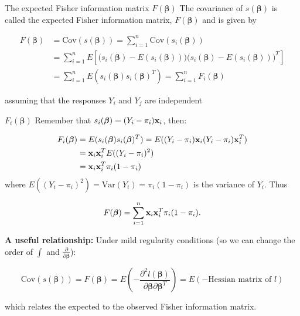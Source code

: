 \documentclass[
  ignorenonframetext,
]{beamer}
\begin{document}
\begin{frame}
\begin{block}{The expected Fisher information matrix
\(F(\boldsymbol{\beta})\)}
\label{the-expected-fisher-information-matrix-fboldsymbolbeta}
The covariance of \(s(\boldsymbol{\beta})\) is called the expected
Fisher information matrix, \(F(\boldsymbol{\beta})\) and is given by

\[
\begin{aligned} 
F(\boldsymbol{\beta}) &= \text{Cov}(s(\boldsymbol{\beta})) = \sum_{i=1}^n \text{Cov}(s_i(\boldsymbol{\beta})) \\
&= \sum_{i=1}^n E\left[\Big(s_i(\boldsymbol{\beta}) - E(s_i(\boldsymbol{\beta}))\Big)\Big(s_i(\boldsymbol{\beta})-E(s_i(\boldsymbol{\beta}))\Big)^T\right] \\
&= \sum_{i=1}^n E(s_i(\boldsymbol{\beta})s_i(\boldsymbol{\beta})^T) = \sum_{i=1}^n F_i(\boldsymbol{\beta}) \end{aligned}
\]

assuming that the responses \(Y_i\) and \(Y_j\) are independent
\end{block}
\end{frame}

\begin{frame}
\begin{block}{\(F_i(\boldsymbol{\beta})\)}
\label{f_iboldsymbolbeta}
Remember that \(s_i(\boldsymbol{\beta})=(Y_i-\pi_i){\bf x}_i\), then:

\[
\begin{aligned}
F_i(\boldsymbol{\beta}) &= E(s_i(\boldsymbol{\beta})s_i(\boldsymbol{\beta})^T) = E((Y_i-\pi_i){\bf x}_i(Y_i-\pi_i){\bf x}_i^T) \\
&= {\bf x}_i{\bf x}_i^T E((Y_i-\pi_i)^2)\\ 
&= {\bf x}_i{\bf x}_i^T \pi_i(1-\pi_i) 
\end{aligned}
\] where \(E((Y_i-\pi_i)^2)=\text{Var}(Y_i)=\pi_i(1-\pi_i)\) is the
variance of \(Y_i\). Thus

\[F(\boldsymbol{\beta}) = \sum_{i=1}^n {\bf x}_i{\bf x}_i^T \pi_i(1-\pi_i).\]
\end{block}
\end{frame}

\begin{frame}
\textbf{A useful relationship:} Under mild regularity conditions (so we
can change the order of \(\int\) and
\(\frac{\partial}{\partial \boldsymbol{\beta}}\)):

\[\text{Cov}(s(\boldsymbol{\beta}))=F(\boldsymbol{\beta}) = E\left( -\frac{\partial^2l(\boldsymbol{\beta})}{\partial\boldsymbol{\beta}\partial\boldsymbol{\beta}^T} \right) = E(-\text{Hessian matrix of }l)\]

which relates the expected to the observed Fisher information matrix.
\end{frame}
\end{document}
